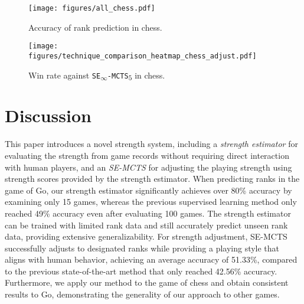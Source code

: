 \begin{figure}[htbp]
\centering
\begin{minipage}{0.7\columnwidth}
\begin{minipage}{0.60\linewidth}
    \texttt{[image: figures/all\_chess.pdf]}
    \caption{Accuracy of rank prediction in chess.}
    \label{fig:all_acc_chess}
\end{minipage}
\hfill
\begin{minipage}{0.38\columnwidth}
 \centering
    \texttt{[image: figures/technique\_comparison\_heatmap\_chess\_adjust.pdf]}
     \captionsetup{width=1.2\linewidth}
    \caption{Win rate against \texttt{SE\textsubscript{$\infty$}-MCTS\textsubscript{$5$}} in chess.}

    \label{fig:fight_chess}
\end{minipage}
\end{minipage}
\end{figure}




\section{Discussion}
\label{sec:discussion}
This paper introduces a novel strength system, including a \textit{strength estimator} for evaluating the strength from game records without requiring direct interaction with human players, and an \textit{SE-MCTS} for adjusting the playing strength using strength scores provided by the strength estimator.
When predicting ranks in the game of Go, our strength estimator significantly achieves over 80\% accuracy by examining only 15 games, whereas the previous supervised learning method only reached 49\% accuracy even after evaluating 100 games.
The strength estimator can be trained with limited rank data and still accurately predict unseen rank data, providing extensive generalizability.
For strength adjustment, SE-MCTS successfully adjusts to designated ranks while providing a playing style that aligns with human behavior, achieving an average accuracy of 51.33\%, compared to the previous state-of-the-art method that only reached 42.56\% accuracy.
Furthermore, we apply our method to the game of chess and obtain consistent results to Go, demonstrating the generality of our approach to other games. 

